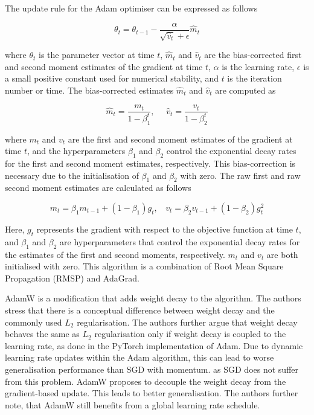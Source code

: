 The update rule for the Adam optimiser can be expressed as follows

$$ \theta_t = \theta_{t-1} - \frac{\alpha}{\sqrt{\hat{v}_t}+\epsilon}\hat{m}_t $$

where $\theta_t$ is the parameter vector at time $t$, $\hat{m}_t$ and $\hat{v}_t$ are the bias-corrected first and second moment estimates of the gradient at time $t$, $\alpha$ is the learning rate, $\epsilon$ is a small positive constant used for numerical stability, and $t$ is the iteration number or time. The bias-corrected estimates $\hat{m}_t$ and $\hat{v}_t$ are computed as

\[ \hat{m}_t=\frac{m_t}{1-\beta_1^t},\ \ \ \ \ \ \hat{v}_t=\frac{v_t}{1-\beta_2^t} \]

where $m_t$ and $v_t$ are the first and second moment estimates of the gradient at time $t$, and the hyperparameters $\beta_1$ and $\beta_2$ control the exponential decay rates for the first and second moment estimates, respectively. This bias-correction is necessary due to the initialisation of $\beta_1$ and $\beta_2$ with zero. The raw first and raw second moment estimates are calculated as follows

\[m_t = \beta_1 m_{t-1} + (1 - \beta_1) g_{t}, \ \ \ \ v_t = \beta_2 v_{t-1} + (1 - \beta_2) g_t^2\]

Here, $g_t$ represents the gradient with respect to the objective function at time $t$, and $\beta_1$ and $\beta_2$ are hyperparameters that control the exponential decay rates for the estimates of the first and second moments, respectively. $m_t$ and $v_t$ are both initialised with zero. \cite{Kingma2014Adam} This algorithm is a combination of Root Mean Square Propagation (RMSP) \cite{Hinton2012RMSProp} and AdaGrad. \cite{Duchi2011Adaptive}

AdamW is a modification that adds weight decay to the algorithm. The authors stress that there is a conceptual difference between weight decay and the commonly used $L_2$ regularisation. The authors further argue that weight decay behaves the same as $L_2$ regularisation only if weight decay is coupled to the learning rate, as done in the PyTorch implementation of Adam. Due to dynamic learning rate updates within the Adam algorithm, this can lead to worse generalisation performance than SGD with momentum. as SGD does not suffer from this problem.
AdamW proposes to decouple the weight decay from the gradient-based update. This leads to better generalisation. The authors further note, that AdamW still benefits from a global learning rate schedule. \cite{Loshchilov2017Decoupled}

